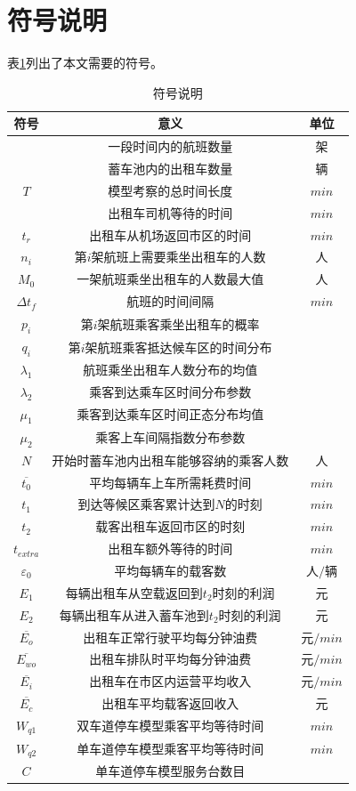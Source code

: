 \documentclass{cumcm}
\begin{document}
\section{符号说明}
表\ref{table-symbol}列出了本文需要的符号。
\begin{table}[H]
	\centering
	\caption{符号说明} 
	\label{table-symbol}
	\begin{tabular*}{0.65\textwidth}{ccc}
		\toprule
		符号 & 意义 & 单位 \\
		\midrule
		\flightnum & 一段时间内的航班数量 & 架 \\
		\taxinum & 蓄车池内的出租车数量 & 辆 \\
		$T$ & 模型考察的总时间长度 & $min$ \\
		\waittime & 出租车司机等待的时间 & $min$ \\
		$t_r$ & 出租车从机场返回市区的时间 & $min$ \\
		$n_i$ & 第$i$架航班上需要乘坐出租车的人数 & 人 \\
		$M_0$ & 一架航班乘坐出租车的人数最大值 & 人 \\
		$\Delta t_f$ & 航班的时间间隔 & $min$ \\
		$p_i$ & 第$i$架航班乘客乘坐出租车的概率 & \\
		$q_i$ & 第$i$架航班乘客抵达候车区的时间分布 & \\
		$\lambda_1$ & 航班乘坐出租车人数分布的均值 & \\
		$\lambda_2$ & 乘客到达乘车区时间分布参数 & \\
		$\mu_1$ & 乘客到达乘车区时间正态分布均值 & \\
		$\mu_2$ & 乘客上车间隔指数分布参数 & \\
		$N$ & 开始时蓄车池内出租车能够容纳的乘客人数 & 人 \\
		$\overline{t_0}$ & 平均每辆车上车所需耗费时间 & $min$ \\
		$t_1$ & 到达等候区乘客累计达到$N$的时刻 & $min$ \\
		$t_2$ & 载客出租车返回市区的时刻 & $min$ \\
		$t_{extra}$ & 出租车额外等待的时间 & $min$ \\
		$\varepsilon_0$ & 平均每辆车的载客数 & 人$/$辆 \\
		$E_1$ & 每辆出租车从空载返回到$t_2$时刻的利润 & 元 \\
		$E_2$ & 每辆出租车从进入蓄车池到$t_2$时刻的利润 & 元 \\
		$\overline{E_o}$ & 出租车正常行驶平均每分钟油费 & 元$/min$ \\
		$\overline{E_{wo}}$ & 出租车排队时平均每分钟油费 & 元$/min$ \\		$\overline{E_i}$ & 出租车在市区内运营平均收入 & 元$/min$ \\
		$\overline{E_c}$ & 出租车平均载客返回收入 & 元 \\
		$W_{q1}$ & 双车道停车模型乘客平均等待时间 & $min$ \\
		$W_{q2}$ & 单车道停车模型乘客平均等待时间 & $min$ \\  
		$C$ & 单车道停车模型服务台数目 & \\
		\bottomrule
	\end{tabular*}
\end{table}
\end{document}
